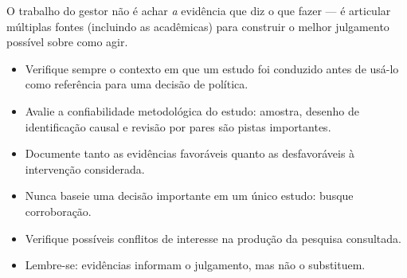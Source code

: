 \documentclass[12pt, a4paper, openany]{book}
\begin{document}
O trabalho do gestor não é achar \textit{a} evidência que diz o que fazer ---
é articular múltiplas fontes (incluindo as acadêmicas) para construir o
melhor julgamento possível sobre como agir.

\begin{atencaobox}
\begin{itemize}[leftmargin=*]
  \item Verifique sempre o contexto em que um estudo foi conduzido antes de
    usá-lo como referência para uma decisão de política.
  \item Avalie a confiabilidade metodológica do estudo: amostra, desenho de
    identificação causal e revisão por pares são pistas importantes.
  \item Documente tanto as evidências favoráveis quanto as desfavoráveis à
    intervenção considerada.
  \item Nunca baseie uma decisão importante em um único estudo: busque
    corroboração.
  \item Verifique possíveis conflitos de interesse na produção da pesquisa
    consultada.
  \item Lembre-se: evidências informam o julgamento, mas não o substituem.
\end{itemize}
\end{atencaobox}



\end{document}
